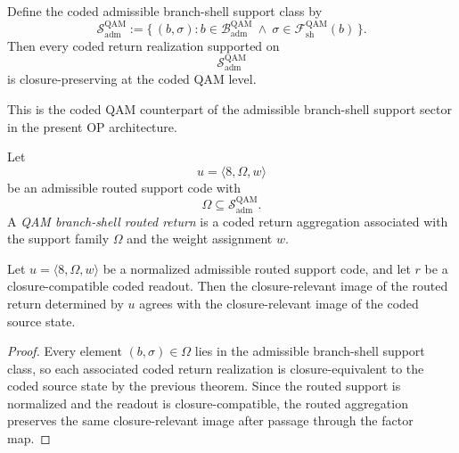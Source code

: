\begin{corollary}
Define the coded admissible branch-shell support class by
\[
\mathcal{S}^{\mathrm{QAM}}_{\mathrm{adm}}
:=
\{\, (b,\sigma): b\in \mathcal{B}^{\mathrm{QAM}}_{\mathrm{adm}}
\ \wedge\
\sigma\in \mathcal{F}^{\mathrm{QAM}}_{\mathrm{sh}}(b)\,\}.
\]
Then every coded return realization supported on
\[
\mathcal{S}^{\mathrm{QAM}}_{\mathrm{adm}}
\]
is closure-preserving at the coded QAM level.
\end{corollary}

\begin{remark}
This is the coded QAM counterpart of the admissible branch-shell support sector in the present OP architecture.
\end{remark}

\begin{definition}
Let
\[
u=\langle 8,\Omega,w\rangle
\]
be an admissible routed support code with
\[
\Omega\subseteq \mathcal{S}^{\mathrm{QAM}}_{\mathrm{adm}}.
\]
A \emph{QAM branch-shell routed return} is a coded return aggregation associated with the support family $\Omega$ and the weight assignment $w$.
\end{definition}

\begin{theorem}\label{thm:qam-routed-support}
Let $u=\langle 8,\Omega,w\rangle$ be a normalized admissible routed support code, and let $r$ be a closure-compatible coded readout. Then the closure-relevant image of the routed return determined by $u$ agrees with the closure-relevant image of the coded source state.
\end{theorem}

\begin{proof}
Every element $(b,\sigma)\in\Omega$ lies in the admissible branch-shell support class, so each associated coded return realization is closure-equivalent to the coded source state by the previous theorem. Since the routed support is normalized and the readout is closure-compatible, the routed aggregation preserves the same closure-relevant image after passage through the factor map.
\end{proof}

